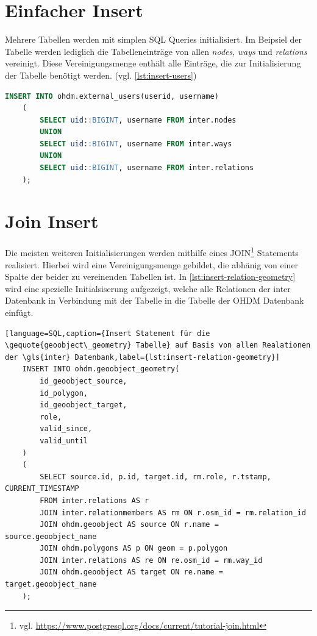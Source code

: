 \section{Einfacher Insert}
Mehrere Tabellen werden mit simplen SQL Queries initialisiert. Im Beipsiel der Tabelle  werden lediglich die Tabelleneinträge von allen \textit{nodes}, \textit{ways} und \textit{relations} vereinigt. Diese Vereinigungsmenge enthält alle Einträge, die zur Initialisierung der  Tabelle benötigt werden. (vgl. \autoref{lst:insert-users})

\begin{lstlisting}[language=SQL,caption={Insert Statement für die \gequote{external\_users} Tabelle},label={lst:insert-users}]
	INSERT INTO ohdm.external_users(userid, username) 
	(
		SELECT uid::BIGINT, username FROM inter.nodes
		UNION
		SELECT uid::BIGINT, username FROM inter.ways
		UNION
		SELECT uid::BIGINT, username FROM inter.relations
	);
\end{lstlisting}

\newpage
\section{Join Insert}
Die meisten weiteren Initialisierungen werden mithilfe eines JOIN\footnote{vgl. \url{https://www.postgresql.org/docs/current/tutorial-join.html}} Statements realisiert. Hierbei wird eine Vereinigungsmenge gebildet, die abhänig von einer Spalte der beider zu vereinenden Tabellen ist. In \autoref{lst:insert-relation-geometry} wird eine spezielle Initialsiserung aufgezeigt, welche alle Relationen der \gls{inter} Datenbank in Verbindung mit der  Tabelle in die  Tabelle der OHDM Datenbank einfügt.

\begin{lstlisting}[language=SQL,caption={Insert Statement für die \gequote{geoobject\_geometry} Tabelle} auf Basis von allen Realationen der \gls{inter} Datenbank,label={lst:insert-relation-geometry}]
	INSERT INTO ohdm.geoobject_geometry(
		id_geoobject_source, 
		id_polygon, 
		id_geoobject_target, 
		role, 
		valid_since, 
		valid_until
	)
	(
		SELECT source.id, p.id, target.id, rm.role, r.tstamp, CURRENT_TIMESTAMP
		FROM inter.relations AS r
		JOIN inter.relationmembers AS rm ON r.osm_id = rm.relation_id
		JOIN ohdm.geoobject AS source ON r.name = source.geoobject_name
		JOIN ohdm.polygons AS p ON geom = p.polygon
		JOIN inter.relations AS re ON re.osm_id = rm.way_id
		JOIN ohdm.geoobject AS target ON re.name = target.geoobject_name
	);
\end{lstlisting}